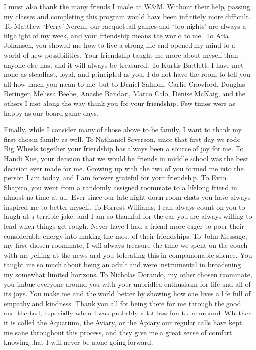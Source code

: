 \documentclass[../main.tex]{subfiles}
\begin{document}
\begin{singlespace}
{{I must also thank the many friends I made at W$\&$M. Without their help, passing my classes and completing this program would have been infinitely more difficult. To Matthew `Perry' Nerem, our racquetball games and `bro nights' are always a highlight of my week, and your friendship means the world to me. To Aria Johansen, you showed me how to live a strong life and opened my mind to a world of new possibilities. Your friendship taught me more about myself than anyone else has, and it will always be treasured. To Kurtis Bartlett, I have met none as steadfast, loyal, and principled as you. I do not have the room to tell you all how much you mean to me, but to Daniel Salmon, Carlie Crawford, Douglas Beringer, Melissa Beebe, Anashe Bandari, Marco Colo, Denise McKaig, and the others I met along the way thank you for your friendship. Few times were as happy as our board game days.\\

} %

{\parindent0pt %
                                                                                 
Finally, while I consider many of those above to be family, I want to thank my first chosen family as well. To Nathaniel Severson, since that first day we rode Big Wheels together your friendship has always been a source of joy for me. To Handi Xue, your decision that we would be friends in middle school was the best decision ever made for me. Growing up with the two of you formed me into the person I am today, and I am forever grateful for your friendship. To Evan Shapiro, you went from a randomly assigned roommate to a lifelong friend in almost no time at all. Ever since our late night dorm room chats you have always inspired me to better myself. To Forrest Williams, I can always count on you to laugh at a terrible joke, and I am so thankful for the ear you are always willing to lend when things get rough. Never have I had a friend more eager to pour their considerable energy into making the most of their friendships. To John Message, my first chosen roommate, I will always treasure the time we spent on the couch with me yelling at the news and you tolerating this in companionable silence. You taught me so much about being an adult and were instrumental in broadening my somewhat limited horizons. To Nicholas Dorando, my other chosen roommate, you imbue everyone around you with your unbridled enthusiasm for life and all of its joys. You make me and the world better by showing how one lives a life full of empathy and kindness. Thank you all for being there for me through the good and the bad, especially when I was probably a lot less fun to be around. Whether it is called the Aquarium, the Aviary, or the Apiary our regular calls have kept me sane throughout this process, and they give me a great sense of comfort knowing that I will never be alone going forward.\\

}}
\end{singlespace}
\end{document}
